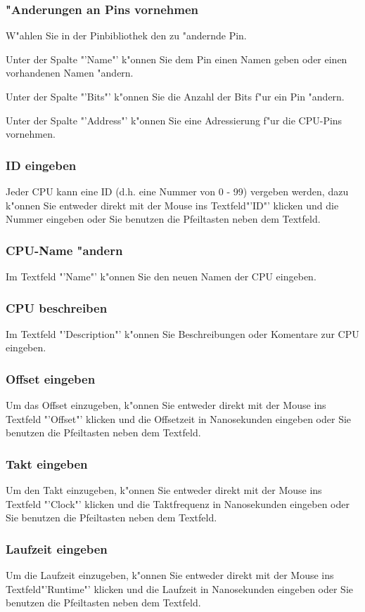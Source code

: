 \documentclass[a4paper,titlepage,12pt,ngerman]{scrbook}
\begin{document}
\subsubsection{"Anderungen an Pins vornehmen}
W"ahlen Sie in der Pinbibliothek den zu "andernde Pin.\par
Unter der Spalte "'Name"' k"onnen Sie dem Pin einen Namen geben oder einen vorhandenen Namen "andern.\par
Unter der Spalte "'Bits"' k"onnen Sie die Anzahl der Bits f"ur ein Pin "andern.\par
Unter der Spalte "'Address"' k"onnen Sie eine Adressierung f"ur die CPU-Pins vornehmen.\par
\subsubsection{ID eingeben}
Jeder CPU kann eine ID (d.h. eine Nummer von 0 - 99) vergeben werden, dazu k"onnen Sie entweder direkt mit der Mouse ins Textfeld"'ID"' klicken und die Nummer eingeben oder Sie benutzen die Pfeiltasten neben dem Textfeld.
\subsubsection{CPU-Name "andern}
Im Textfeld "'Name"' k"onnen Sie den neuen Namen der CPU eingeben.
\subsubsection{CPU beschreiben}
Im Textfeld "'Description"' k"onnen Sie Beschreibungen oder Komentare zur CPU eingeben.
\subsubsection{Offset eingeben}
Um das Offset einzugeben, k"onnen Sie entweder direkt mit der Mouse ins Textfeld "'Offset"' klicken und die Offsetzeit in Nanosekunden eingeben oder Sie benutzen die Pfeiltasten neben dem Textfeld. 
\subsubsection{Takt eingeben}
Um den Takt einzugeben, k"onnen Sie entweder direkt mit der Mouse ins Textfeld "'Clock"' klicken und die Taktfrequenz in Nanosekunden eingeben oder Sie benutzen die Pfeiltasten neben dem Textfeld. 
\subsubsection{Laufzeit eingeben}
Um die Laufzeit einzugeben, k"onnen Sie entweder direkt mit der Mouse ins Textfeld"'Runtime"' klicken und die Laufzeit in Nanosekunden eingeben oder Sie benutzen die Pfeiltasten neben dem Textfeld. 
\end{document}
